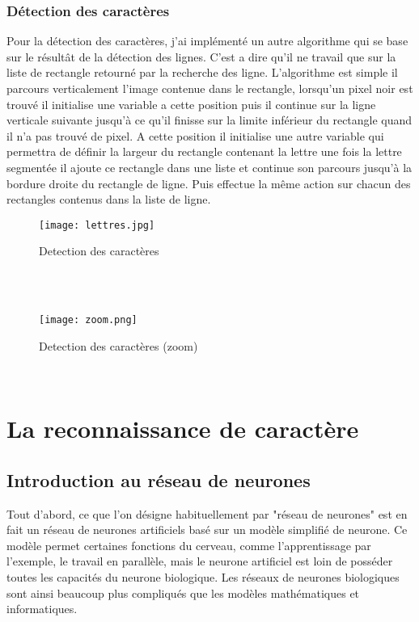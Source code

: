 \documentclass{article}
\begin{document}
                          \subsubsection {Détection des caractères}
Pour la détection des caractères, j’ai implémenté un autre algorithme qui se base
sur le résultât de la détection des lignes. C’est a dire qu’il ne travail que sur la liste
de rectangle retourné par la recherche des ligne. L’algorithme est simple il parcours
verticalement l’image contenue dans le rectangle, lorsqu’un pixel noir est trouvé il
initialise une variable a cette position puis il continue sur la ligne verticale suivante
jusqu’à ce qu’il finisse sur la limite inférieur du rectangle quand il n’a pas trouvé de
pixel. A cette position il initialise une autre variable qui permettra de définir la largeur
du rectangle contenant la lettre une fois la lettre segmentée il ajoute ce rectangle dans
une liste et continue son parcours jusqu’à la bordure droite du rectangle de ligne. Puis
effectue la même action sur chacun des rectangles contenus dans la liste de ligne.
\newpage
\\
   \begin{figure}[hp]
	    \centering
	    \texttt{[image: lettres.jpg]}
	    \caption{Detection des caractères}
    \end{figure}
\\
\\
   \begin{figure}[hp]
	    \centering
	    \texttt{[image: zoom.png]}
	    \caption{Detection des caractères (zoom)}
    \end{figure}
\\

       \section {La reconnaissance de caractère}
                \subsection{Introduction au réseau de neurones }
Tout d’abord, ce que l’on désigne habituellement par "réseau de neurones" est en fait un réseau de neurones artificiels basé sur un modèle simplifié de neurone. Ce modèle permet certaines fonctions du cerveau, comme l’apprentissage par l’exemple, le travail en parallèle, mais le neurone artificiel est loin de posséder toutes les capacités du neurone biologique. Les réseaux de neurones biologiques sont ainsi beaucoup plus compliqués que les modèles mathématiques et informatiques. \\
\end{document}
